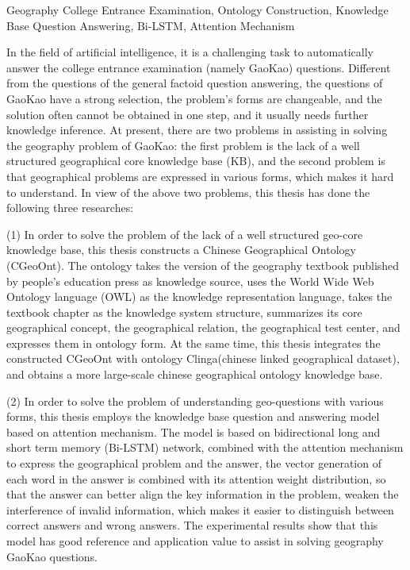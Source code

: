 \begin{englishabstract}{Geography College Entrance Examination, Ontology Construction, Knowledge Base Question Answering, Bi-LSTM, Attention Mechanism}

	In the field of artificial intelligence, it is a challenging task to automatically answer the college entrance examination (namely GaoKao) questions. Different from the questions of the general factoid question answering, the questions of GaoKao have a strong selection, the problem's forms are changeable, and the solution often cannot be obtained in one step, and it usually needs further knowledge inference. At present, there are two problems in assisting in solving the geography problem of GaoKao: the first problem is the lack of a well structured geographical core knowledge base (KB), and the second problem is that geographical problems are expressed in various forms, which makes it hard to understand. In view of the above two problems, this thesis has done the following three researches:
	
(1) In order to solve the problem of the lack of a well structured geo-core knowledge base, this thesis constructs a Chinese Geographical Ontology (CGeoOnt). The ontology takes the  version of the geography textbook published by people's education press as knowledge source, uses the World Wide Web Ontology language (OWL) as the knowledge representation language, takes the textbook chapter as the knowledge system structure, summarizes its core geographical concept, the geographical relation, the geographical test center, and expresses them in ontology form. At the same time, this thesis integrates the constructed CGeoOnt with ontology Clinga(chinese linked geographical dataset), and obtains a more large-scale chinese geographical ontology knowledge base.
	
(2) In order to solve  the problem of understanding geo-questions with various forms, this thesis employs the knowledge base question and answering model based on attention mechanism. The model is based on bidirectional long and short term memory (Bi-LSTM) network, combined with the attention mechanism to express the geographical problem and the answer, the vector generation of each word in the answer is combined with its attention weight distribution, so that the answer can better align the key information in the problem, weaken the interference of invalid information, which makes it easier to distinguish between correct answers and wrong answers. The experimental results show that this model has good reference and application value to assist in solving geography GaoKao questions.


\end{englishabstract}
